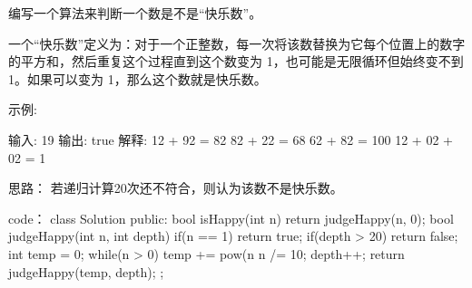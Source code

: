 编写一个算法来判断一个数是不是“快乐数”。

一个“快乐数”定义为：对于一个正整数，每一次将该数替换为它每个位置上的数字的平方和，然后重复这个过程直到这个数变为 1，也可能是无限循环但始终变不到 1。如果可以变为 1，那么这个数就是快乐数。

示例: 

输入: 19
输出: true
解释: 
12 + 92 = 82
82 + 22 = 68
62 + 82 = 100
12 + 02 + 02 = 1

























思路：
若递归计算20次还不符合，则认为该数不是快乐数。
























code：
class Solution {
public:
    bool isHappy(int n) {
        return judgeHappy(n, 0); 
    }
    bool judgeHappy(int n, int depth)
    {
        if(n == 1) return true;
        if(depth > 20) return false;
        int temp = 0;
        while(n > 0)
        {
            temp += pow(n%
            n /= 10;
        }
        depth++;
        return judgeHappy(temp, depth); 
    }
};